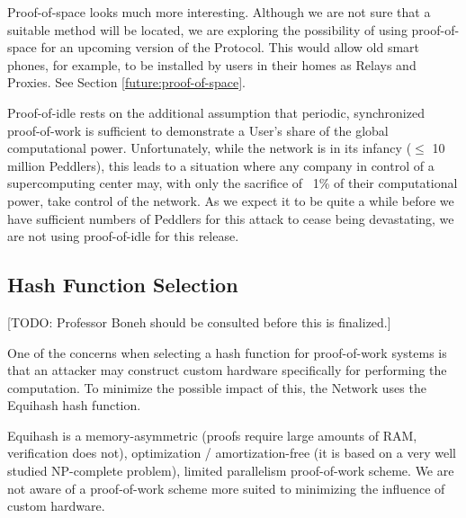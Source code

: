 Proof-of-space looks much more interesting. Although we are not sure that a suitable method will be located, we are exploring the possibility of using proof-of-space for an upcoming version of the \Orchid{} Protocol. This would allow old smart phones, for example, to be installed by users in their homes as Relays and Proxies. See Section \ref{future:proof-of-space}.

Proof-of-idle rests on the additional assumption that periodic, synchronized proof-of-work is sufficient to demonstrate a User’s share of the global computational power. Unfortunately, while the network is in its infancy ($\leq$ 10 million Peddlers), this leads to a situation where any company in control of a supercomputing center may, with only the sacrifice of ~1\% of their computational power, take control of the network. As we expect it to be quite a while before we have sufficient numbers of Peddlers for this attack to cease being devastating, we are not using proof-of-idle for this release.

\subsection{Hash Function Selection}

[TODO: Professor Boneh should be consulted before this is finalized.]

One of the concerns when selecting a hash function for proof-of-work
systems is that an attacker may construct custom hardware specifically
for performing the computation. To minimize the possible impact of
this, the \Orchid{} Network uses the Equihash hash function\cite{Equihash}.

Equihash is a memory-asymmetric (proofs require large amounts of RAM,
verification does not), optimization / amortization-free (it is based on
a very well studied NP-complete problem), limited parallelism
proof-of-work scheme. We are not aware of a proof-of-work scheme more
suited to minimizing the influence of custom hardware.
